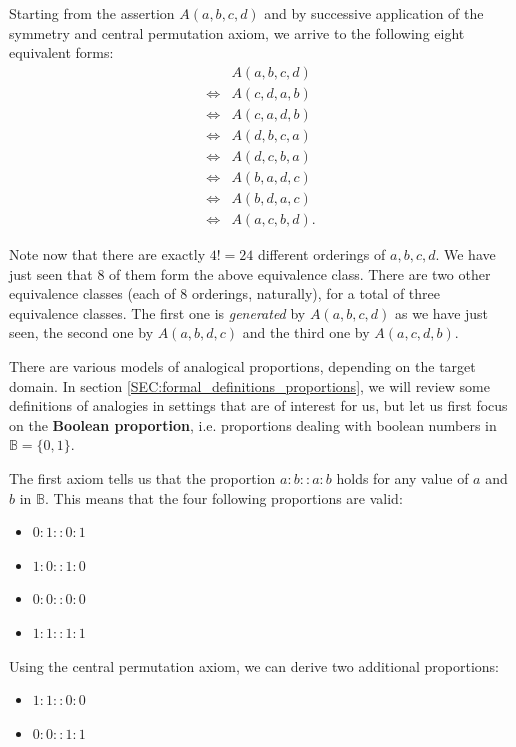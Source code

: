 Starting from the assertion $A(a, b, c, d)$ and by successive application of
the symmetry and central permutation axiom, we arrive to the following eight
equivalent forms:
\begin{align*}
       &A(a, b, c, d)\\
  \iff &A(c, d, a, b)\\
  \iff &A(c, a, d, b)\\
  \iff &A(d, b, c, a)\\
  \iff &A(d, c, b, a)\\
  \iff &A(b, a, d, c)\\
  \iff &A(b, d, a, c)\\
  \iff &A(a, c, b, d).
\end{align*}

Note now that there are exactly $4! = 24$ different orderings of $a, b, c, d$.
We have just seen that $8$ of them form the above equivalence class. There are
two other equivalence classes (each of $8$ orderings, naturally), for a total
of three equivalence classes. The first one is \textit{generated} by $A(a, b,
c, d)$ as we have just seen, the second one by $A(a, b, d, c)$ and the third
one by $A(a, c, d, b)$.

There are various models of analogical proportions, depending on the target
domain. In section \ref{SEC:formal_definitions_proportions}, we will review
some definitions of analogies in settings that are of interest for us, but let
us first focus on the \textbf{Boolean proportion}, i.e. proportions dealing
with boolean numbers in $\mathbb{B} = \{0, 1\}$.

The first axiom tells us that the proportion $a:b::a:b$ holds for any value of
$a$ and $b$ in $\mathbb{B}$. This means that the four following proportions are
valid:
\begin{itemize}
  \item $0 : 1 :: 0 :1$
  \item $1 : 0 :: 1 :0$
  \item $0 : 0 :: 0 :0$
  \item $1 : 1 :: 1 :1$
\end{itemize}

Using the central permutation axiom, we can derive two additional proportions:

\begin{itemize}
  \item $1 : 1 :: 0 : 0$
  \item $0 : 0 :: 1 : 1$
\end{itemize}

